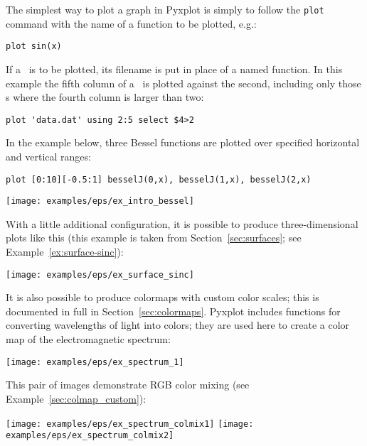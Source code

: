 
The simplest way to plot a graph in Pyxplot is simply to follow the {\tt plot}
command with the name of a function to be plotted, e.g.:

\begin{verbatim}
plot sin(x)
\end{verbatim}

\noindent If a \datafile\ is to be plotted, its filename is put in place of a
named function. In this example the fifth column of a \datafile\ is plotted
against the second, including only those \datapoint s where the fourth column
is larger than two:

\begin{verbatim}
plot 'data.dat' using 2:5 select $4>2
\end{verbatim}

In the example below, three Bessel functions are plotted over specified
horizontal and vertical ranges:

\begin{verbatim}
plot [0:10][-0.5:1] besselJ(0,x), besselJ(1,x), besselJ(2,x)
\end{verbatim}
\begin{center}
\texttt{[image: examples/eps/ex\_intro\_bessel]}
\end{center}

\noindent With a little additional configuration, it is possible to produce
three-dimensional plots like this (this example is taken from
Section~\ref{sec:surfaces}; see Example~\ref{ex:surface-sinc}):

\begin{center}
\texttt{[image: examples/eps/ex\_surface\_sinc]}
\end{center}

\noindent It is also possible to produce colormaps with custom color scales;
this is documented in full in Section~\ref{sec:colormaps}.  Pyxplot includes
functions for converting wavelengths of light into colors; they are used here
to create a color map of the electromagnetic spectrum:

\begin{center}
\texttt{[image: examples/eps/ex\_spectrum\_1]}
\end{center}

\noindent This pair of images demonstrate RGB color mixing (see
Example~\ref{sec:colmap_custom}):

\begin{center}
\texttt{[image: examples/eps/ex\_spectrum\_colmix1]}
\texttt{[image: examples/eps/ex\_spectrum\_colmix2]}
\end{center}

